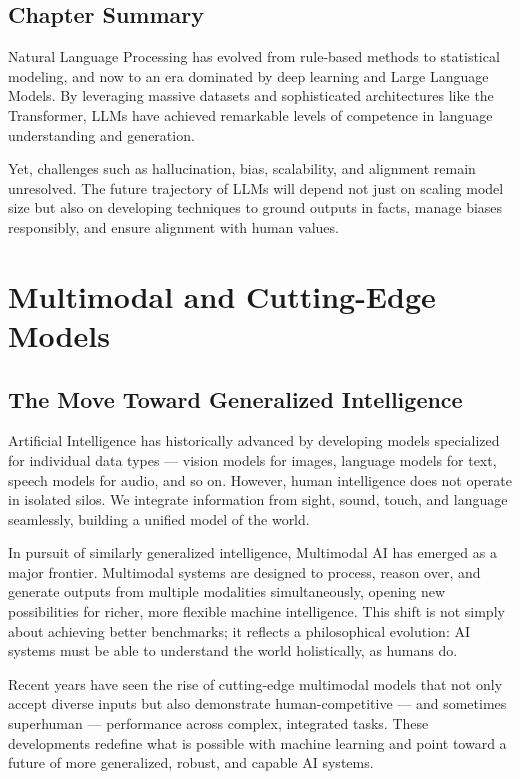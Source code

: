 \documentclass[openany]{book}
\begin{document}
\section{Chapter Summary}

Natural Language Processing has evolved from rule-based methods to statistical
modeling, and now to an era dominated by deep learning and Large Language 
Models. By leveraging massive datasets and sophisticated architectures like 
the Transformer, LLMs have achieved remarkable levels of competence in language 
understanding and generation.

Yet, challenges such as hallucination, bias, scalability, and alignment remain 
unresolved. The future trajectory of LLMs will depend not just on scaling model 
size but also on developing techniques to ground outputs in facts, manage biases 
responsibly, and ensure alignment with human values.

\chapter{Multimodal and Cutting-Edge Models}

\section{The Move Toward Generalized Intelligence}

Artificial Intelligence has historically advanced by developing models 
specialized for individual data types — vision models for images, language 
models for text, speech models for audio, and so on. However, human intelligence 
does not operate in isolated silos. We integrate information from sight, sound, 
touch, and language seamlessly, building a unified model of the world.

In pursuit of similarly generalized intelligence, Multimodal AI has emerged as a 
major frontier. Multimodal systems are designed to process, reason over, and 
generate outputs from multiple modalities simultaneously, opening new 
possibilities for richer, more flexible machine intelligence. This shift is not 
simply about achieving better benchmarks; it reflects a philosophical evolution: 
AI systems must be able to understand the world holistically, as humans do.

Recent years have seen the rise of cutting-edge multimodal models that not only 
accept diverse inputs but also demonstrate human-competitive — and sometimes 
superhuman — performance across complex, integrated tasks. These developments 
redefine what is possible with machine learning and point toward a future of 
more generalized, robust, and capable AI systems.
\end{document}

